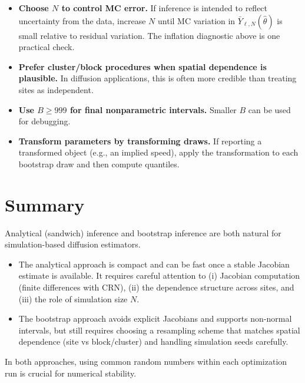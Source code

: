 \documentclass[11pt]{article}
\begin{document}
\begin{itemize}
  \item \textbf{Choose $N$ to control MC error.} If inference is intended to reflect
        uncertainty from the data, increase $N$ until MC variation in
        $\bar Y_{\ell,N}(\hat\theta)$ is small relative to residual variation.
        The inflation diagnostic above is one practical check.

  \item \textbf{Prefer cluster/block procedures when spatial dependence is plausible.}
        In diffusion applications, this is often more credible than treating sites
        as independent.

  \item \textbf{Use $B\ge 999$ for final nonparametric intervals.} Smaller $B$ can be
        used for debugging.

  \item \textbf{Transform parameters by transforming draws.} If reporting a transformed
        object (e.g., an implied speed), apply the transformation to each bootstrap
        draw and then compute quantiles.
\end{itemize}

\section{Summary}

Analytical (sandwich) inference and bootstrap inference are both natural for
simulation-based diffusion estimators.

\begin{itemize}
  \item The analytical approach is compact and can be fast once a stable Jacobian
        estimate is available. It requires careful attention to (i) Jacobian
        computation (finite differences with CRN), (ii) the dependence structure
        across sites, and (iii) the role of simulation size $N$.

  \item The bootstrap approach avoids explicit Jacobians and supports non-normal
        intervals, but still requires choosing a resampling scheme that matches
        spatial dependence (site vs block/cluster) and handling simulation seeds
        carefully.
\end{itemize}

In both approaches, using common random numbers within each optimization run is
crucial for numerical stability.
\end{document}
